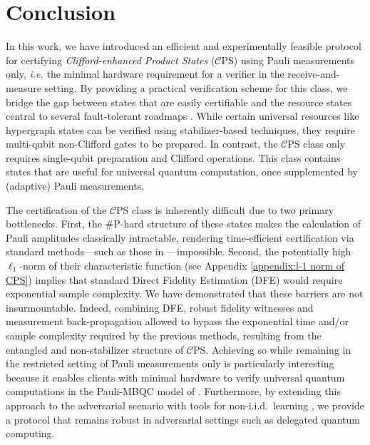 \documentclass[a4paper,twocolumn,11pt,unpublished]{../../revision/quantumarticle}
\newcommand{\CEPS}{$\mathcal C$PS}
\newcommand{\mCEPS}{\mathcal{C}\text{PS}}
\begin{document}
\section{Conclusion}
\label{section:conclusion}

In this work, we have introduced an efficient and experimentally feasible protocol for certifying \emph{Clifford-enhanced Product States} ($\mCEPS$) using Pauli measurements only, \textit{i.e.} the minimal hardware requirement for a verifier in the receive-and-measure setting. By providing a practical verification scheme for this class, we bridge the gap between states that are easily certifiable and the resource states central to several fault-tolerant roadmaps \cite{DBMA25breaking, G23cleaner, AAAA22suppressing, MGCM25ibm, GSJ24magic}. 
While certain universal resources like hypergraph states can be verified using stabilizer-based techniques, they require multi-qubit non-Clifford gates to be prepared.
In contrast, the $\mCEPS$ class only requires single-qubit preparation and Clifford operations.  This class contains states that are useful for universal quantum computation, once supplemented by (adaptive) Pauli measurements.



The certification of the $\mCEPS$ class is inherently difficult due to two primary bottlenecks. First, the \#P-hard structure of these states makes the calculation of Pauli amplitudes classically intractable, rendering time-efficient certification via standard methods—such as those in \cite{HPS24certifying, GHO25few}—impossible. Second, the potentially high $\ell_1$-norm of their characteristic function (see Appendix \ref{appendix:l-1 norm of CPS}) implies that standard Direct Fidelity Estimation (DFE) \cite{FOS24optimal} would require exponential sample complexity. We have demonstrated that these barriers are not insurmountable. Indeed, combining DFE, robust fidelity witnesses and measurement back-propagation allowed to bypass the exponential time and/or sample complexity required by the previous methods, resulting from the entangled and non-stabilizer structure of \CEPS. Achieving so while remaining in the restricted setting of Pauli measurements only is particularly interesting because it enables clients with minimal hardware to verify universal quantum computations in the Pauli-MBQC model of \cite{SDKO07direct}.
Furthermore, by extending this approach to the adversarial scenario with tools for non-i.i.d.\ learning \cite{FKMO24learning}, we provide a protocol that remains robust in adversarial settings such as delegated quantum computing.
\end{document}
